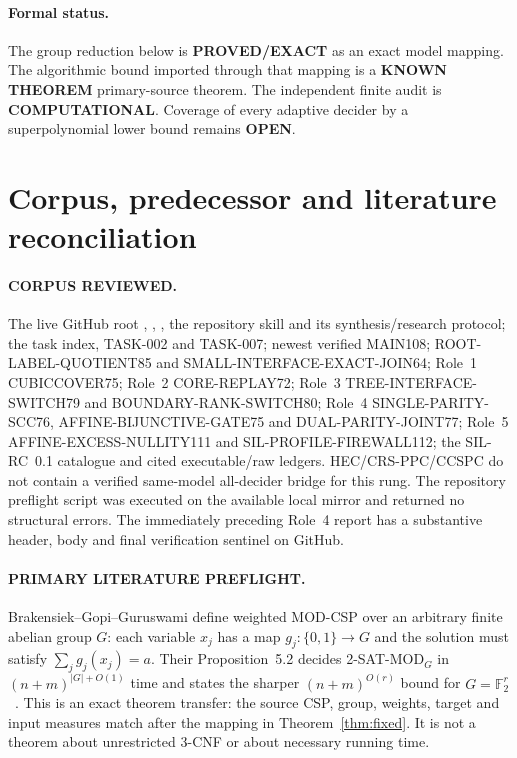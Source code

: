 \documentclass[11pt]{article}
\newcommand{\PROVED}{\textbf{PROVED/EXACT}}
\newcommand{\KNOWN}{\textbf{KNOWN THEOREM}}
\newcommand{\COMP}{\textbf{COMPUTATIONAL}}
\newcommand{\OPEN}{\textbf{OPEN}}
\begin{document}
\paragraph{Formal status.}
The group reduction below is \PROVED{} as an exact model mapping.  The
algorithmic bound imported through that mapping is a \KNOWN{} primary-source
theorem.  The independent finite audit is \COMP.  Coverage of every adaptive
decider by a superpolynomial lower bound remains \OPEN.

\section{Corpus, predecessor and literature reconciliation}
\paragraph{CORPUS REVIEWED.}
The live GitHub root , , , the
repository  skill and its synthesis/research protocol;
the task index, TASK-002 and TASK-007; newest verified MAIN108;
ROOT-LABEL-QUOTIENT85 and SMALL-INTERFACE-EXACT-JOIN64; Role~1 CUBICCOVER75;
Role~2 CORE-REPLAY72; Role~3 TREE-INTERFACE-SWITCH79 and
BOUNDARY-RANK-SWITCH80; Role~4 SINGLE-PARITY-SCC76,
AFFINE-BIJUNCTIVE-GATE75 and DUAL-PARITY-JOINT77; Role~5
AFFINE-EXCESS-NULLITY111 and SIL-PROFILE-FIREWALL112; the SIL-RC~0.1
catalogue and cited executable/raw ledgers.  HEC/CRS-PPC/CCSPC do not contain
a verified same-model all-decider bridge for this rung.  The repository
preflight script was executed on the available local mirror and returned no
structural errors.  The immediately preceding Role~4 report has a substantive
header, body and final verification sentinel on GitHub.

\paragraph{PRIMARY LITERATURE PREFLIGHT.}
Brakensiek--Gopi--Guruswami define weighted MOD-CSP over an arbitrary finite
abelian group $G$: each variable $x_j$ has a map $g_j:\{0,1\}\to G$ and the
solution must satisfy $\sum_j g_j(x_j)=a$.  Their Proposition~5.2 decides
2-SAT-MOD$_G$ in $(n+m)^{|G|+O(1)}$ time and states the sharper
$(n+m)^{O(r)}$ bound for $G=\mathbb F_2^r$~\cite{BGG}.  This is an exact
theorem transfer: the source CSP, group, weights, target and input measures
match after the mapping in Theorem~\ref{thm:fixed}.  It is not a theorem about
unrestricted 3-CNF or about necessary running time.
\end{document}
